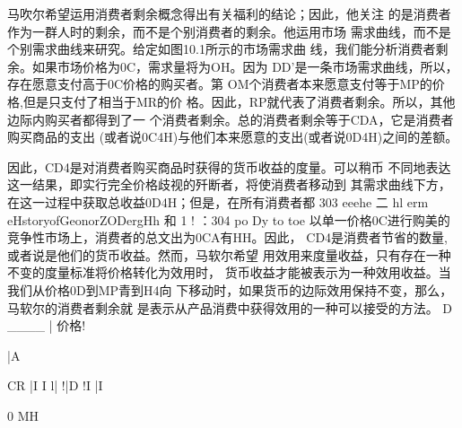 马吹尔希望运用消费者剩余概念得出有关福利的结论；因此，他关注
的是消费者作为一群人时的剩余，而不是个别消费者的剩余。他运用市场
需求曲线，而不是个别需求曲线来研究。给定如图10.1所示的市场需求曲
线，我们能分析消费者剩余。如果市场价格为0C，需求量将为OH。因为
DD'是一条市场需求曲线，所以，存在愿意支付高于0C价格的购买者。第
OM个消费者本来愿意支付等于MP的价格,但是只支付了相当于MR的价
格。因此，RP就代表了消费者剩余。所以，其他边际内购买者都得到了一
个消费者剩余。总的消费者剩余等于CDA，它是消费者购买商品的支出
(或者说0C4H)与他们本来愿意的支出(或者说0D4H)之间的差额。

因此，CD4是对消费者购买商品时获得的货币收益的度量。可以稍币
不同地表达这一结果，即实行完全价格歧视的歼断者，将使消费者移动到
其需求曲线下方，在这一过程中获取总收益0D4H；但是，在所有消费者都
303
eeehe
二
hl
erm
eHstoryofGeonorZODergHh
和
1
!
：304
po
Dy
to
toe
以单一价格0C进行购美的竞争性市场上，消费者的总文出为0CA有HH。因此，
CD4是消费者节省的数量,或者说是他们的货币收益。然而，马软尔希望
用效用来度量收益，只有存在一种不变的度量标准将价格转化为效用时，
货币收益才能被表示为一种效用收益。当我们从价格0D到MP青到H4向
下移动时，如果货币的边际效用保持不变，那么，马软尔的消费者剩余就
是表示从产品消费中获得效用的一种可以接受的方法。
D
____\Pr
|
价格!

|A

CR
|I
I
l|
!|D
!I
|I

0
MH

